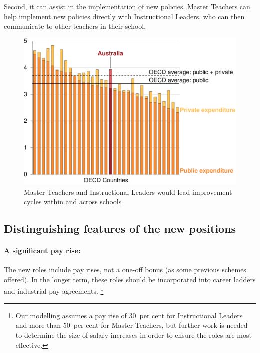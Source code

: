 \documentclass{grattan}
\begin{document}
Second, it can assist in the implementation of new policies. Master Teachers can help implement new policies directly with Instructional Leaders, who can then communicate to other teachers in their school.

\begin{figure}
\caption{Master Teachers and Instructional Leaders would lead improvement cycles within and across schools}\label{fig:new-positions-improve-the-system}
\includegraphics[page=17]{atlas/Charts.pdf}

\end{figure}

\subsection{Distinguishing features of the new positions}\label{subsec:distinguishing-features-of-the-new-positions}

\paragraph{A significant pay rise:} The new roles include pay rises, not a one-off bonus (as some previous schemes offered). In the longer term, these roles should be incorporated into career ladders and industrial pay agreements.%
\footnote{Our modelling assumes a pay rise of 30~per cent for Instructional Leaders and more than 50~per cent for Master Teachers, but further work is needed to determine the size of salary increases in order to ensure the roles are most effective.}
\end{document}
